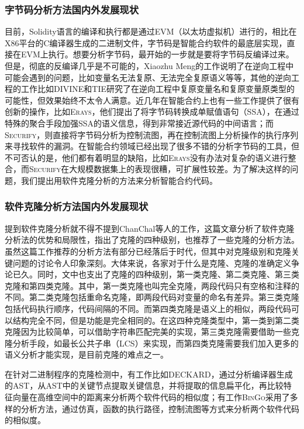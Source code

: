 \subsubsection{字节码分析方法国内外发展现状}

目前，Solidity语言的编译和执行都是通过EVM（以太坊虚拟机）进行的，相比在X86平台的C编译器生成的二进制文件，字节码是智能合约软件的最底层实现，直接在EVM上执行。想要分析字节码，最开始的一步就是要将字节码反编译过来。但是，彻底的反编译几乎是不可能的，Xiaozhu Meng的工作\cite{binary-not-ez}说明了在逆向工程中可能会遇到的问题，比如变量名无法复原、无法完全复原语义等等，其他的逆向工程的工作比如\textsc{DIVINE}\cite{divine}和\textsc{TIE}\cite{tie}研究了在逆向工程中复原变量名和复原变量原类型的可能性，但效果始终不太令人满意。近几年在智能合约上也有一些工作提供了很有创新的操作，比如\textsc{Erays}\cite{erays}，他们提出了将字节码转换成单赋值语句（SSA），在通过特殊的聚合手段加强SSA的语义信息，得到非常接近源代码的中间语言；而\textsc{Securify}\cite{securify}，则直接将字节码分析为控制流图，再在控制流图上分析操作的执行序列来寻找软件的漏洞。在智能合约领域已经出现了很多不错的分析字节码的工具，但不可否认的是，他们都有着明显的缺陷，比如\textsc{Erays}没有办法对复杂的语义进行整合，而\textsc{Securify}在大规模数据集上的表现很糟，可扩展性较差。为了解决这样的问题，我们提出用软件克隆分析的方法来分析智能合约代码。

\subsubsection{软件克隆分析方法国内外发展现状}
提到软件克隆分析就不得不提到ChanChal等人的工作\cite{survey-on-clone}，这篇文章分析了软件克隆分析法的优势和局限性，指出了克隆的四种级别，也推荐了一些克隆的分析方法。虽然这篇工作推荐的分析方法有部分已经落后于时代，但其中对克隆级别和克隆关键问题的讨论令人印象深刻。大体来说，各家对于什么是克隆、克隆的准确定义争论已久。同时，文中也支出了克隆的四种级别，第一类克隆、第二类克隆、第三类克隆和第四类克隆。其中，第一类克隆也叫完全克隆，两段代码只有空格和注释的不同。第二类克隆包括重命名克隆，即两段代码对变量的命名有差异。第三类克隆包括代码执行顺序，代码间隔的不同。而第四类克隆是语义上的相似，两段代码可以结构完全不同，但是功能是完全相同的。在这四种克隆类型中，第一类到第二类克隆因为比较简单，可以借助字符串匹配完美的实现，第三类克隆需要借助一些克隆分析手段，如最长公共子串（LCS）来实现，而第四类克隆需要我们加入更多的语义分析才能实现，是目前克隆的难点之一。

在针对二进制程序的克隆检测中，有工作比如\textsc{DECKARD}\cite{deckard}，通过分析编译器生成的AST，从AST中的关键节点提取关键信息，并将提取的信息扁平化，再比较特征向量在高维空间中的距离来分析两个软件代码的相似度；有工作\textsc{BinGo}\cite{bingo}采用了多样的分析方法，通过仿真，函数的执行路径，控制流图等方式来分析两个软件代码的相似度。

